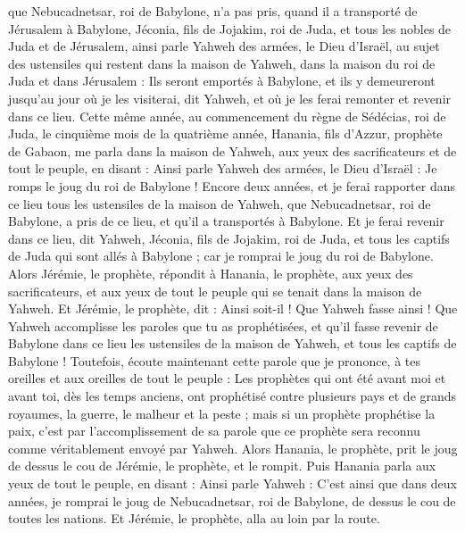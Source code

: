 \begin{multicols}{2}
que Nebucadnetsar, roi de Babylone, n'a pas pris, quand il a transporté de Jérusalem à Babylone, Jéconia, fils de Jojakim, roi de Juda, et tous les nobles de Juda et de Jérusalem,
ainsi parle Yahweh des armées, le Dieu d'Israël, au sujet des ustensiles qui restent dans la maison de Yahweh, dans la maison du roi de Juda et dans Jérusalem :
Ils seront emportés à Babylone, et ils y demeureront jusqu'au jour où je les visiterai, dit Yahweh, et où je les ferai remonter et revenir dans ce lieu.
\VerseOne{}Cette même année, au commencement du règne de Sédécias, roi de Juda, le cinquième mois de la quatrième année, Hanania, fils d'Azzur, prophète de Gabaon, me parla dans la maison de Yahweh, aux yeux des sacrificateurs et de tout le peuple, en disant :
Ainsi parle Yahweh des armées, le Dieu d'Israël : Je romps le joug du roi de Babylone !
Encore deux années, et je ferai rapporter dans ce lieu tous les ustensiles de la maison de Yahweh, que Nebucadnetsar, roi de Babylone, a pris de ce lieu, et qu'il a transportés à Babylone.
Et je ferai revenir dans ce lieu, dit Yahweh, Jéconia, fils de Jojakim, roi de Juda, et tous les captifs de Juda qui sont allés à Babylone ; car je romprai le joug du roi de Babylone.
Alors Jérémie, le prophète, répondit à Hanania, le prophète, aux yeux des sacrificateurs, et aux yeux de tout le peuple qui se tenait dans la maison de Yahweh.
Et Jérémie, le prophète, dit : Ainsi soit-il ! Que Yahweh fasse ainsi ! Que Yahweh accomplisse les paroles que tu as prophétisées, et qu'il fasse revenir de Babylone dans ce lieu les ustensiles de la maison de Yahweh, et tous les captifs de Babylone !
Toutefois, écoute maintenant cette parole que je prononce, à tes oreilles et aux oreilles de tout le peuple :
Les prophètes qui ont été avant moi et avant toi, dès les temps anciens, ont prophétisé contre plusieurs pays et de grands royaumes, la guerre, le malheur et la peste ;
mais si un prophète prophétise la paix, c'est par l'accomplissement de sa parole que ce prophète sera reconnu comme véritablement envoyé par Yahweh.
Alors Hanania, le prophète, prit le joug de dessus le cou de Jérémie, le prophète, et le rompit.
Puis Hanania parla aux yeux de tout le peuple, en disant : Ainsi parle Yahweh : C'est ainsi que dans deux années, je romprai le joug de Nebucadnetsar, roi de Babylone, de dessus le cou de toutes les nations. Et Jérémie, le prophète, alla au loin par la route.

\end{multicols}
